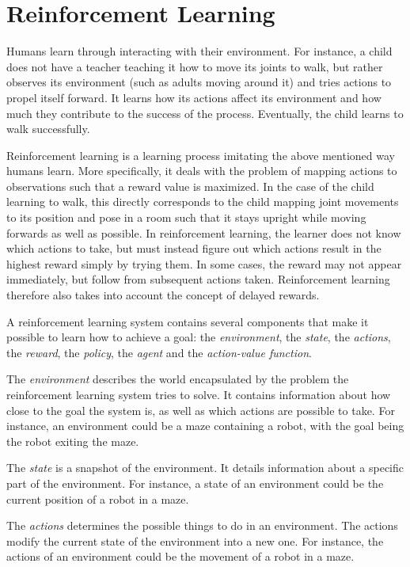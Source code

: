 \documentclass{kththesis}
\begin{document}
\section{Reinforcement Learning}
\label{sec:reinforcementlearning}
Humans learn through interacting with their environment. For instance, a child does not have a teacher teaching it how to move its joints to walk, but rather observes its environment (such as adults moving around it) and tries actions to propel itself forward. It learns how its actions affect its environment and how much they contribute to the success of the process. Eventually, the child learns to walk successfully. 

Reinforcement learning is a learning process imitating the above mentioned way humans learn. More specifically, it deals with the problem of mapping actions to observations such that a reward value is maximized. In the case of the child learning to walk, this directly corresponds to the child mapping joint movements to its position and pose in a room such that it stays upright while moving forwards as well as possible. In reinforcement learning, the learner does not know which actions to take, but must instead figure out which actions result in the highest reward simply by trying them. In some cases, the reward may not appear immediately, but follow from subsequent actions taken. Reinforcement learning therefore also takes into account the concept of delayed rewards. \parencite{sutton1998introduction}

A reinforcement learning system contains several components that make it possible to learn how to achieve a goal: the \textit{environment}, the \textit{state}, the \textit{actions}, the \textit{reward}, the \textit{policy}, the \textit{agent} and the \textit{action-value function}.

The \textit{environment} describes the world encapsulated by the problem the reinforcement learning system tries to solve. It contains information about how close to the goal the system is, as well as which actions are possible to take. For instance, an environment could be a maze containing a robot, with the goal being the robot exiting the maze.

The \textit{state} is a snapshot of the environment. It details information about a specific part of the environment. For instance, a state of an environment could be the current position of a robot in a maze.

The \textit{actions} determines the possible things to do in an environment. The actions modify the current state of the environment into a new one. For instance, the actions of an environment could be the movement of a robot in a maze. 
\end{document}
